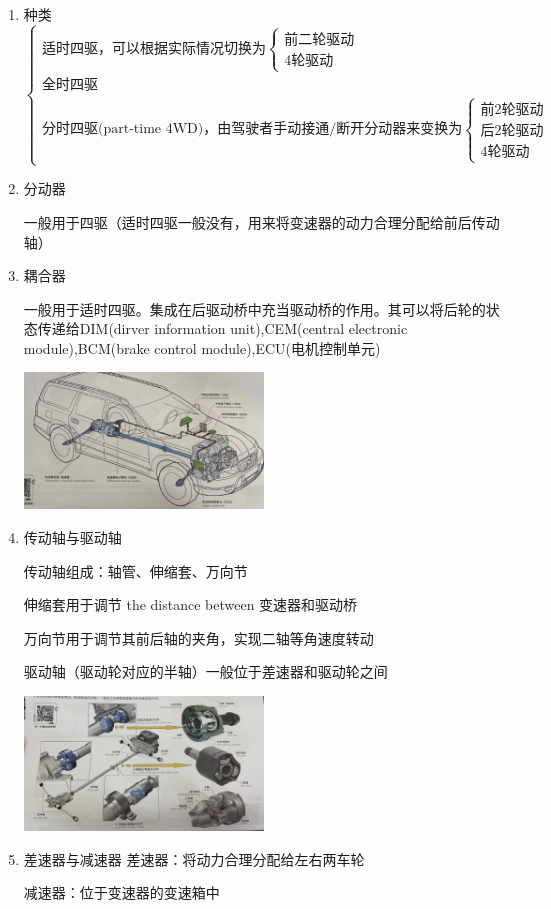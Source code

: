 		\begin{enumerate}[label*=\arabic*)]
			\item 种类
				\begin{equation*}
					\begin{cases}
						\text{适时四驱，可以根据实际情况切换为}\begin{cases}
							\text{前二轮驱动} \\
							\text{4轮驱动}
						\end{cases} \\
						\text{全时四驱} \\
						\text{分时四驱(part-time 4WD)，由驾驶者手动接通/断开分动器来变换为}\begin{cases}
							\text{前2轮驱动} \\
							\text{后2轮驱动} \\
							\text{4轮驱动}
						\end{cases}
					\end{cases}
				\end{equation*}
			\item 分动器
			
				一般用于四驱（适时四驱一般没有，用来将变速器的动力合理分配给前后传动轴）
			\item 耦合器
			
				一般用于适时四驱。集成在后驱动桥中充当驱动桥的作用。其可以将后轮的状态传递给DIM(dirver information unit),CEM(central electronic module),BCM(brake control module),ECU(电机控制单元)
				\begin{center}
					\includegraphics[width=0.5\textwidth]{3-10}
				\end{center}
			\item 传动轴与驱动轴
			
				传动轴组成：轴管、伸缩套、万向节
				
				伸缩套用于调节 the distance between 变速器和驱动桥
				
				万向节用于调节其前后轴的夹角，实现二轴等角速度转动
				
				驱动轴（驱动轮对应的半轴）一般位于差速器和驱动轮之间
				\begin{center}
					\includegraphics[width=0.5\textwidth]{3-11}
				\end{center}
			\item 差速器与减速器
				差速器：将动力合理分配给左右两车轮
				
				减速器：位于变速器的变速箱中
		\end{enumerate}
